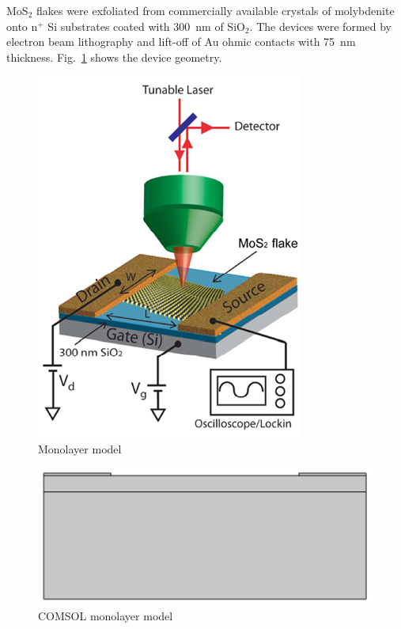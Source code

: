 \documentclass[electronics,article,submit,moreauthors,pdftex]{Definitions/mdpi}
\begin{document}
MoS$_2$ flakes were exfoliated from commercially available crystals of molybdenite onto n$^+$ Si substrates coated with \SI{300}{\nano \meter} of SiO$_2$. The devices were formed by electron beam lithography and lift-off of Au ohmic contacts with \SI{75}{\nano \meter} thickness. Fig.~\ref{fig:monolayer_model} shows the device geometry.

\begin{figure}[H]
	\centering
	\includegraphics[width=.5\textwidth]{Immagini/monolayer_model.png} 
	\caption{Monolayer model~\cite{Wu:Ultrathin_MoS2}}
	\label{fig:monolayer_model}
\end{figure} 

\begin{figure}[H]
	\centering
	\includegraphics[width=.7\textwidth]{Immagini/monolayer_model_comsol.png}
	\caption{COMSOL monolayer model}
	\label{fig:monolayer_model_comsol}
\end{figure} 
\end{document}
